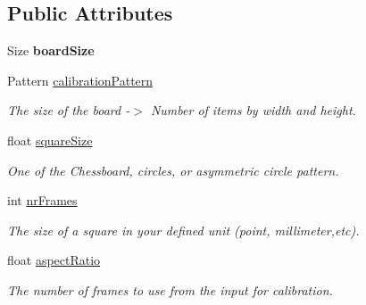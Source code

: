 \subsection*{Public Attributes}
\begin{DoxyCompactItemize}
\item 
\mbox{\label{class_image_processing_1_1_settings_a770816e7e69514da9c30b6cd8d4884d3}} 
Size {\bfseries board\+Size}
\item 
\mbox{\label{class_image_processing_1_1_settings_a18737bf420fac72e36996613e18353b1}} 
Pattern \mbox{\hyperlink{class_image_processing_1_1_settings_a18737bf420fac72e36996613e18353b1}{calibration\+Pattern}}
\begin{DoxyCompactList}\small\item\em The size of the board -\/$>$ Number of items by width and height. \end{DoxyCompactList}\item 
\mbox{\label{class_image_processing_1_1_settings_affaf2de3b7bed5e18f5474441d63f024}} 
float \mbox{\hyperlink{class_image_processing_1_1_settings_affaf2de3b7bed5e18f5474441d63f024}{square\+Size}}
\begin{DoxyCompactList}\small\item\em One of the Chessboard, circles, or asymmetric circle pattern. \end{DoxyCompactList}\item 
\mbox{\label{class_image_processing_1_1_settings_aad57c66429dc3484941f9a3cd59370ce}} 
int \mbox{\hyperlink{class_image_processing_1_1_settings_aad57c66429dc3484941f9a3cd59370ce}{nr\+Frames}}
\begin{DoxyCompactList}\small\item\em The size of a square in your defined unit (point, millimeter,etc). \end{DoxyCompactList}\item 
\mbox{\label{class_image_processing_1_1_settings_a9b0ecbce66c879fc8d61a6a2a993c5fd}} 
float \mbox{\hyperlink{class_image_processing_1_1_settings_a9b0ecbce66c879fc8d61a6a2a993c5fd}{aspect\+Ratio}}
\begin{DoxyCompactList}\small\item\em The number of frames to use from the input for calibration. \end{DoxyCompactList}\item 

\end{DoxyCompactItemize}

